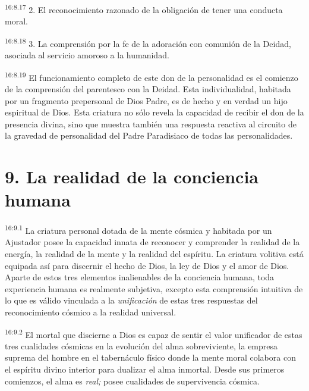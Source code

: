 \par
\textsuperscript{16:8.17} 2. El reconocimiento razonado de la obligación de tener una conducta moral.

\par
\textsuperscript{16:8.18} 3. La comprensión por la fe de la adoración con comunión de la Deidad, asociada al servicio amoroso a la humanidad.

\par
\textsuperscript{16:8.19} El funcionamiento completo de este don de la personalidad es el comienzo de la comprensión del parentesco con la Deidad. Esta individualidad, habitada por un fragmento prepersonal de Dios Padre, es de hecho y en verdad un hijo espiritual de Dios. Esta criatura no sólo revela la capacidad de recibir el don de la presencia divina, sino que muestra también una respuesta reactiva al circuito de la gravedad de personalidad del Padre Paradisiaco de todas las personalidades.

\section*{9. La realidad de la conciencia humana}
\par
\textsuperscript{16:9.1} La criatura personal dotada de la mente cósmica y habitada por un Ajustador posee la capacidad innata de reconocer y comprender la realidad de la energía, la realidad de la mente y la realidad del espíritu. La criatura volitiva está equipada así para discernir el hecho de Dios, la ley de Dios y el amor de Dios. Aparte de estos tres elementos inalienables de la conciencia humana, toda experiencia humana es realmente subjetiva, excepto esta comprensión intuitiva de lo que es válido vinculada a la \textit{unificación} de estas tres respuestas del reconocimiento cósmico a la realidad universal.

\par
\textsuperscript{16:9.2} El mortal que discierne a Dios es capaz de sentir el valor unificador de estas tres cualidades cósmicas en la evolución del alma sobreviviente, la empresa suprema del hombre en el tabernáculo físico donde la mente moral colabora con el espíritu divino interior para dualizar el alma inmortal. Desde sus primeros comienzos, el alma es \textit{real;} posee cualidades de supervivencia cósmica.

